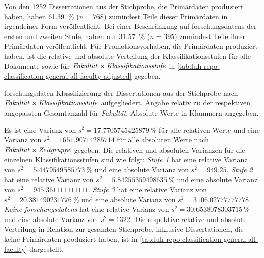 Von den \num{1252} Dissertationen aus der Stichprobe, die Primärdaten produziert haben, haben \SI{61,39}{\percent} ($n=\num{768}$) zumindest Teile dieser Primärdaten in irgendeiner Form veröffentlicht.
Bei einer Beschränkung auf \glspl{forschungsdaten} der ersten und zweiten Stufe, haben nur \SI{31,57}{\percent} ($n=\num{395}$) zumindest Teile ihrer Primärdaten veröffentlicht.
Für Promotionsvorhaben, die Primärdaten produziert haben, ist die relative und absolute Verteilung der Klassifikationsstufen für alle Dokumente sowie für $\text{\textit{Fakultät}}\times\text{\textit{Klassifikationsstufe}}$ in \cref{tab:luh-repo-classification-general-all-faculty-adjusted} gegeben.
\begin{table}[!htbp]
	\caption{\gls{forschungsdaten}-Klassifizierung der Dissertationen aus der Stichprobe nach $\text{\textit{Fakultät}}\times\text{\textit{Klassifikationsstufe}}$ aufgegliedert.
    Angabe relativ zu der respektiven angepassten Gesamtanzahl für \textit{Fakultät}.
    Absolute Werte in Klammern angegeben.}
    
    \label{tab:luh-repo-classification-general-all-faculty-adjusted}
\end{table}
Es ist eine Varianz von $s^2=\SI[round-mode=places,round-precision=3]{17.7705745425879}{\percent}$ für alle relativen Werte und eine Varianz von $s^2=\num[round-mode=places,round-precision=3]{1651.90714285714}$ für alle absoluten Werte nach $\text{\textit{Fakultät}}\times\text{\textit{Zeitgruppe}}$ gegeben.
Die relativen und absoluten Varianzen für die einzelnen Klassifikationsstufen sind wie folgt:
\textit{Stufe 1} hat eine relative Varianz von $s^2=\SI[round-mode=places,round-precision=3]{5.4479549585773}{\percent}$ und eine absolute Varianz von $s^2=\num[round-mode=places,round-precision=3]{949.25}$.
\textit{Stufe 2} hat eine relative Varianz von $s^2=\SI[round-mode=places,round-precision=3]{5.84255359498635}{\percent}$ und eine absolute Varianz von $s^2=\num[round-mode=places,round-precision=3]{945.361111111111}$.
\textit{Stufe 3} hat eine relative Varianz von $s^2=\SI[round-mode=places,round-precision=3]{20.381490231776}{\percent}$ und eine absolute Varianz von $s^2=\num[round-mode=places,round-precision=3]{3106.02777777778}$.
\textit{Keine \glspl{forschungsdaten}} hat eine relative Varianz von $s^2=\SI[round-mode=places,round-precision=3]{30.6538078303715}{\percent}$ und eine absolute Varianz von $s^2=\num[round-mode=places,round-precision=3]{1322}$.
Die respektive relative und absolute Verteilung in Relation zur gesamten Stichprobe, inklusive Dissertationen, die keine Primärdaten produziert haben, ist in \cref{tab:luh-repo-classification-general-all-faculty} dargestellt.
